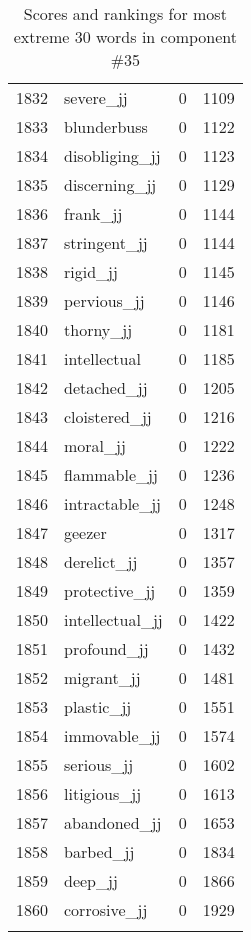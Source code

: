 \begin{longtable}[!htbp]{| rlr@{.}l |}
    1832 & severe\_jj & 0 & 1109 \\
    1833 & blunderbuss & 0 & 1122 \\
    1834 & disobliging\_jj & 0 & 1123 \\
    1835 & discerning\_jj & 0 & 1129 \\
    1836 & frank\_jj & 0 & 1144 \\
    1837 & stringent\_jj & 0 & 1144 \\
    1838 & rigid\_jj & 0 & 1145 \\
    1839 & pervious\_jj & 0 & 1146 \\
    1840 & thorny\_jj & 0 & 1181 \\
    1841 & intellectual & 0 & 1185 \\
    1842 & detached\_jj & 0 & 1205 \\
    1843 & cloistered\_jj & 0 & 1216 \\
    1844 & moral\_jj & 0 & 1222 \\
    1845 & flammable\_jj & 0 & 1236 \\
    1846 & intractable\_jj & 0 & 1248 \\
    1847 & geezer & 0 & 1317 \\
    1848 & derelict\_jj & 0 & 1357 \\
    1849 & protective\_jj & 0 & 1359 \\
    1850 & intellectual\_jj & 0 & 1422 \\
    1851 & profound\_jj & 0 & 1432 \\
    1852 & migrant\_jj & 0 & 1481 \\
    1853 & plastic\_jj & 0 & 1551 \\
    1854 & immovable\_jj & 0 & 1574 \\
    1855 & serious\_jj & 0 & 1602 \\
    1856 & litigious\_jj & 0 & 1613 \\
    1857 & abandoned\_jj & 0 & 1653 \\
    1858 & barbed\_jj & 0 & 1834 \\
    1859 & deep\_jj & 0 & 1866 \\
    1860 & corrosive\_jj & 0 & 1929 \\
    \hline
    \caption{Scores and rankings for most extreme 30 words in component \#35} \\
\end{longtable}
